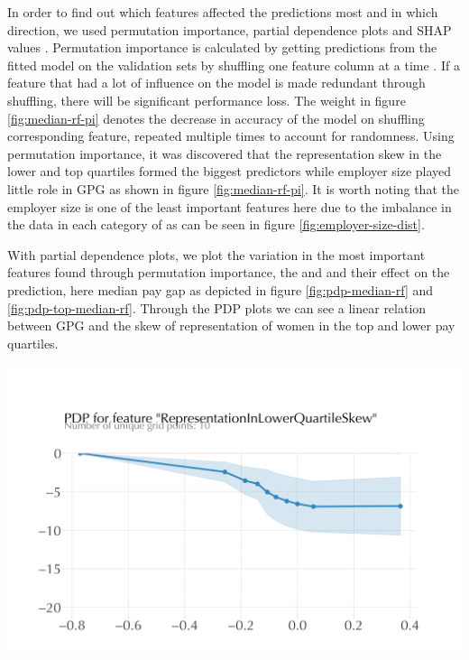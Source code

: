 In order to find out which features affected the predictions most and in which direction, we used permutation importance, partial dependence plots and SHAP values \cite{Molnar2020}.
Permutation importance is calculated by getting predictions from the fitted model on the validation sets by shuffling one feature column at a time \cite{Altmann2010}. If a feature that had a lot of influence on the model is made redundant through shuffling, there will be significant performance loss. 
The weight in figure \ref{fig:median-rf-pi} denotes the decrease in accuracy of the model on shuffling corresponding feature, repeated multiple times to account for randomness.
Using permutation importance, it was discovered that the representation skew in the lower and top quartiles formed the biggest predictors while employer size played little role in GPG as shown in figure \ref{fig:median-rf-pi}. 
It is worth noting that the employer size is one of the least important features here due to the imbalance in the data in each category of  as can be seen in figure \ref{fig:employer-size-dist}.


With partial dependence plots, we plot the variation in the most important features found through permutation importance, the  and  and their effect on the prediction, here median pay gap as depicted in figure \ref{fig:pdp-median-rf} and \ref{fig:pdp-top-median-rf}. Through the PDP plots we can see a linear relation between GPG and the skew of representation of women in the top and lower pay quartiles.

\begin{centering}
    \includegraphics[width=1.1\linewidth]{images/DiffMedianHourlyPercent-RepresentationInLowerQuartileSkew-pdp.png}
    \label{fig:pdp-median-rf}
\end{centering}

